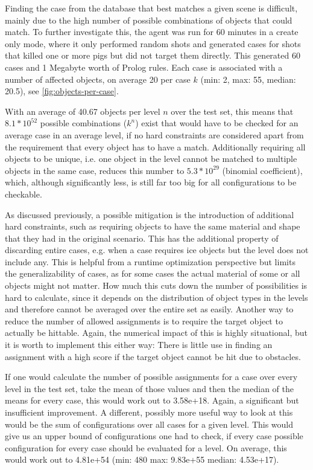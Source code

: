 Finding the case from the database that best matches a given scene is difficult, mainly due to the high number of possible combinations of objects that could match.
To further investigate this, the agent was run for 60 minutes in a create only mode, where it only performed random shots and generated cases for shots that killed one or more pigs but did not target them directly.
This generated 60 cases and 1 Megabyte worth of Prolog rules. Each case is associated with a number of affected objects, on average 20 per case $k$ (min: 2, max: 55, median: 20.5), see \ref{fig:objects-per-case}.

With an average of 40.67 objects per level $n$ over the test set, this means that
$8.1*10^52$ possible combinations ($k^n$) exist that would have to be checked for an average case in an average level, if no hard constraints are considered apart from the requirement that every object has to have a match.
Additionally requiring all objects to be unique, i.e. one object in the level cannot be matched to multiple objects in the same case, reduces this number to
$5.3*10^29$ (binomial coefficient), which, although significantly less, is still far too big for all configurations to be checkable.


As discussed previously, a possible mitigation is the introduction of additional hard constraints, such as requiring objects to have the same material and shape that they had in the original scenario.
This has the additional property of discarding entire cases, e.g. when a case requires ice objects but the level does not include any.
This is helpful from a runtime optimization perspective but limits the generalizability of cases, as for some cases the actual material of some or all objects might not matter.
How much this cuts down the number of possibilities is hard to calculate, since it depends on the distribution of object types in the levels and therefore cannot be averaged over the entire set as easily.
Another way to reduce the number of allowed assignments is to require the target object to actually be hittable.
Again, the numerical impact of this is highly situational, but it is worth to implement this either way:
There is little use in finding an assignment with a high score if the target object cannot be hit due to obstacles.

If one would calculate the number of possible assignments for a case over every level in the test set, take the mean of those values and then the median of the means for every case, this would work out to 3.58e+18. Again, a significant but insufficient improvement.
A different, possibly more useful way to look at this would be the sum of configurations over all cases for a given level. This would give us an upper bound of configurations one had to check, if every case possible configuration for every case should be evaluated for a level. On average, this would work out to 4.81e+54 (min: 480 max: 9.83e+55 median: 4.53e+17).

